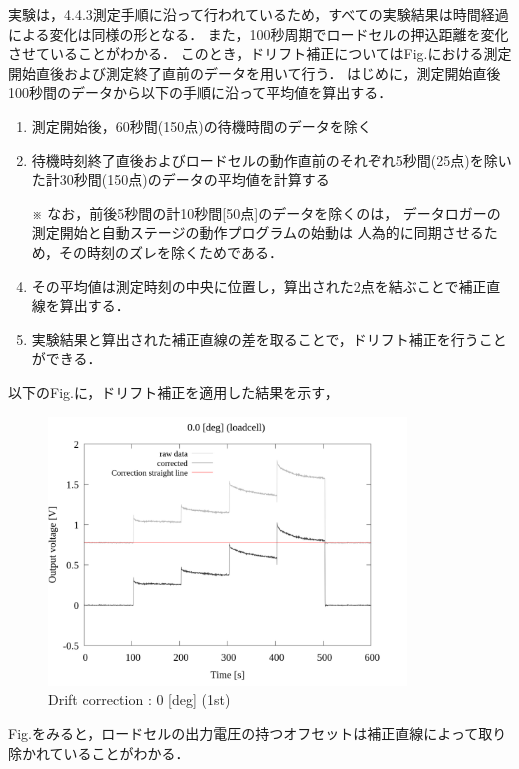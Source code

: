 実験は，4.4.3測定手順に沿って行われているため，すべての実験結果は時間経過による変化は同様の形となる．
また，100秒周期でロードセルの押込距離を変化させていることがわかる．
このとき，ドリフト補正についてはFig.における測定開始直後および測定終了直前のデータを用いて行う．
はじめに，測定開始直後100秒間のデータから以下の手順に沿って平均値を算出する．

\begin{enumerate}[(1)]
    \item 測定開始後，60秒間(150点)の待機時間のデータを除く
    \item 待機時刻終了直後およびロードセルの動作直前のそれぞれ5秒間(25点)を除いた計30秒間(150点)のデータの平均値を計算する
    \item [※] なお，前後5秒間の計10秒間[50点]のデータを除くのは，
            データロガーの測定開始と自動ステージの動作プログラムの始動は
            人為的に同期させるため，その時刻のズレを除くためである．
    \item その平均値は測定時刻の中央に位置し，算出された2点を結ぶことで補正直線を算出する．
    \item 実験結果と算出された補正直線の差を取ることで，ドリフト補正を行うことができる．
\end{enumerate}

以下のFig.に，ドリフト補正を適用した結果を示す，

\begin{figure}[htbp]
    \footnotesize
    \begin{center}
        \includegraphics[width=95mm]{../../02_workspace/result/2-1/plot/02-1_loadcell/02_loadcell-drift_0.png}
        \caption{Drift correction : 0 [deg] (1st)}
    \end{center}
\end{figure}

Fig.をみると，ロードセルの出力電圧の持つオフセットは補正直線によって取り除かれていることがわかる．

